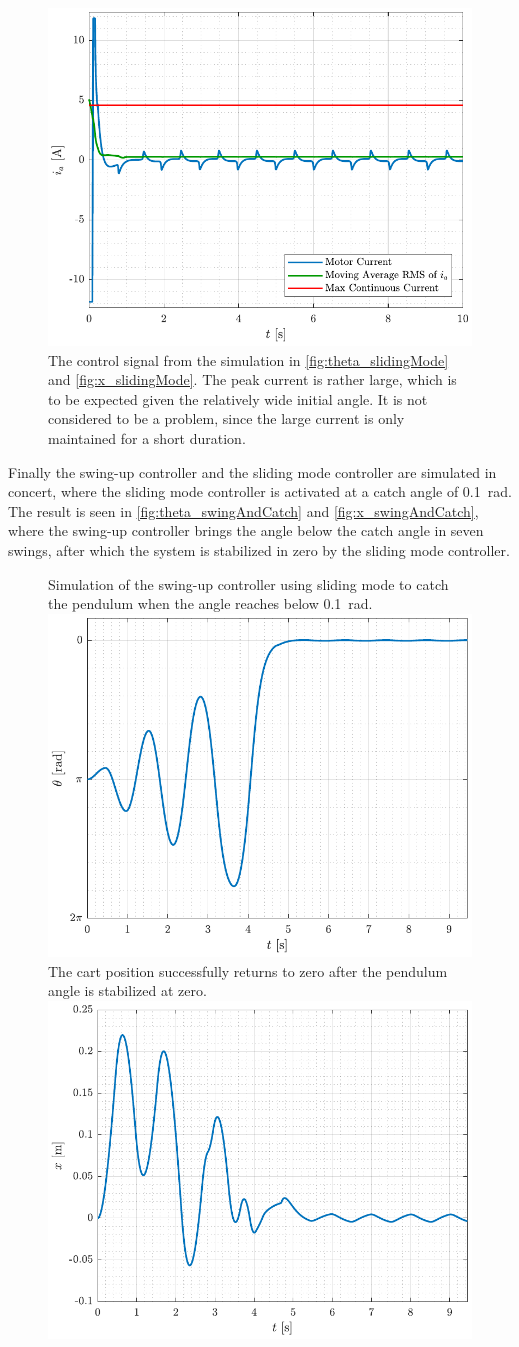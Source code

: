 %
\begin{figure}[H]
  \includegraphics[width=.42\textwidth]{figures/ia_slidingMode}
  \caption{The control signal from the simulation in \autoref{fig:theta_slidingMode} and \ref{fig:x_slidingMode}. The peak current is rather large, which is to be expected given the relatively wide initial angle. It is not considered to be a problem, since the large current is only maintained for a short duration.}
  \label{fig:ia_slidingMode}
\end{figure}
%
Finally the swing-up controller and the sliding mode controller are simulated in concert, where the sliding mode controller is activated at a catch angle of \SI{0.1}{rad}. The result is seen in \autoref{fig:theta_swingAndCatch} and \autoref{fig:x_swingAndCatch}, where the swing-up controller brings the angle below the catch angle in seven swings, after which the system is stabilized in zero by the sliding mode controller.
%
\begin{figure}[H]
  \hspace{-10pt}
  \captionbox
  {
    Simulation of the swing-up controller using sliding mode to catch the pendulum when the angle reaches below \SI{0.1}{rad}.
    \label{fig:theta_swingAndCatch}
  }
  {
    \hspace{-1cm}
    \includegraphics[width=.4\textwidth]{figures/theta_swingAndCatch}
  }
  \hspace{20pt}
  \captionbox 
  {
    The cart position successfully returns to zero after the pendulum angle is stabilized at zero.
    \label{fig:x_swingAndCatch}
  }
  {
    \hspace{-1cm}
    \includegraphics[width=.4\textwidth]{figures/x_swingAndCatch}
  }  
\end{figure}

